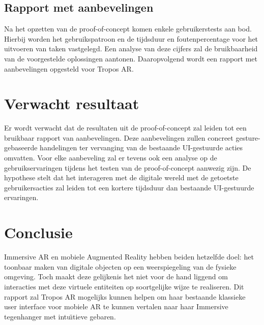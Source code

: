 \subsection{Rapport met aanbevelingen}
\label{subsec:result-of-poc}
Na het opzetten van de proof-of-concept komen enkele gebruikerstests aan bod. %
Hierbij worden het gebruikspatroon en de tijdsduur en foutenpercentage voor het uitvoeren van taken vastgelegd.
Een analyse van deze cijfers zal de bruikbaarheid van de voorgestelde oplossingen aantonen.
Daaropvolgend wordt een rapport met aanbevelingen opgesteld voor Tropos AR.

\section{Verwacht resultaat}%
\label{sec:verwachte_resultaten}
Er wordt verwacht dat de resultaten uit de proof-of-concept zal leiden tot een bruikbaar rapport van aanbevelingen.
Deze aanbevelingen zullen concreet gesture-gebaseerde handelingen ter vervanging van de bestaande UI-gestuurde acties omvatten.
Voor elke aanbeveling zal er tevens ook een analyse op de gebruikservaringen tijdens het testen van de proof-of-concept aanwezig zijn.
De hypothese stelt dat het interageren met de digitale wereld met de getoetste gebruikersacties zal leiden tot een kortere tijdsduur dan bestaande UI-gestuurde ervaringen.

\section{Conclusie}%
\label{sec:conclusie}
Immersive AR en mobiele Augmented Reality hebben beiden hetzelfde doel: het toonbaar maken van digitale objecten op een weerspiegeling van de fysieke omgeving.
Toch maakt deze gelijkenis het niet voor de hand liggend om interacties met deze virtuele entiteiten op soortgelijke wijze te realiseren.
Dit rapport zal Tropos AR mogelijks kunnen helpen om haar bestaande klassieke user interface voor mobiele AR te kunnen vertalen naar haar Immersive tegenhanger met intu\"{\i}tieve gebaren.